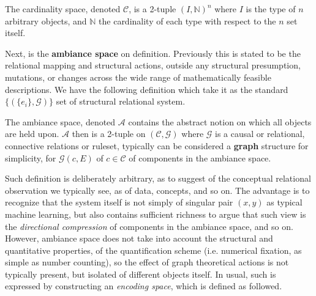 \begin{definition}
  The cardinality space, denoted $\mathcal{C}$, is a 2-tuple $(I,\mathbb{N})^{n}$ where $I$ is the type of $n$ arbitrary objects, and $\mathbb{N}$ the cardinality of each type with respect to the $n$ set itself. 
\end{definition}
Next, is the \textbf{ambiance space} on definition. Previously this is stated to be the relational mapping and structural actions, outside any structural presumption, mutations, or changes across the wide range of mathematically feasible descriptions. We have the following definition which take it as the standard $\{(\{e_{i}\},\mathcal{G})\}$ set of structural relational system. 
\begin{definition}
  The ambiance space, denoted $\mathcal{A}$ contains the abstract notion on which all objects are held upon. $\mathcal{A}$ then is a 2-tuple on $(\mathcal{C},\mathcal{G})$ where $\mathcal{G}$ is a causal or relational, connective relations or ruleset, typically can be considered a \textbf{graph} structure for simplicity, for $\mathcal{G}(c,E)$ of $c\in\mathcal{C}$ of components in the ambiance space. 
\end{definition}
Such definition is deliberately arbitrary, as to suggest of the conceptual relational observation we typically see, as of data, concepts, and so on. The advantage is to recognize that the system itself is not simply of singular pair $(x,y)$ as typical machine learning, but also contains sufficient richness to argue that such view is the \textit{directional compression} of components in the ambiance space, and so on. However, ambiance space does not take into account the structural and quantitative properties, of the quantification scheme (i.e. numerical fixation, as simple as number counting), so the effect of graph theoretical actions is not typically present, but isolated of different objects itself. In usual, such is expressed by constructing an \textit{encoding space}, which is defined as followed.  
